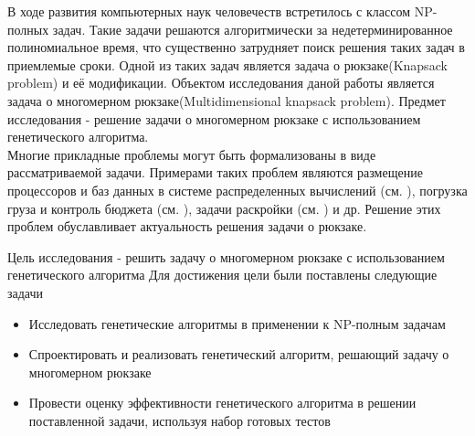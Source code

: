 В ходе развития компьютерных наук человечеств встретилось с классом NP-полных задач. Такие задачи решаются алгоритмически за недетерминированное полиномиальное время, что существенно затрудняет поиск решения таких задач в приемлемые сроки.
 Одной из таких задач является задача о рюкзаке(Knapsack problem) и её модификации.
 Объектом исследования даной работы является задача о многомерном рюкзаке(Multidimensional knapsack problem).
 Предмет исследования - решение задачи о многомерном рюкзаке с использованием генетического алгоритма.
\\Многие прикладные проблемы могут быть формализованы в виде рассматриваемой задачи. Примерами таких проблем являются размещение процессоров
и баз данных в системе распределенных вычислений (см. \cite{Гэвиш1982}), погрузка груза и контроль бюджета (см. \cite{Ших1979}), задачи раскройки (см. \cite{Гилмор1966}) и др. 
Решение этих проблем обуславливает актуальность решения задачи о рюкзаке.

Цель исследования - решить задачу о многомерном рюкзаке с использованием генетического алгоритма
Для достижения цели были поставлены следующие задачи
\begin{itemize}
\item Исследовать генетические алгоритмы в применении к NP-полным задачам
\item Спроектировать и реализовать генетический алгоритм, решающий задачу о многомерном рюкзаке
\item Провести оценку эффективности генетического алгоритма в решении поставленной задачи, используя набор готовых тестов
\end{itemize} 
